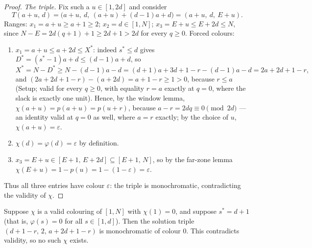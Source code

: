 \begin{proof}
\emph{The triple.} Fix such a $u \in [1, 2d]$ and consider
\[
T(a + u,\, d)
= \bigl(a + u,\ d,\ (a + u) + (d - 1)a + d\bigr)
= (a + u,\ d,\ E + u) .
\]
Ranges: $x_1 = a + u \ge a + 1 \ge 2$; $x_2 = d \in [1, N]$;
$x_3 = E + u \le E + 2d \le N$, since
$N - E = 2d(q+1) + 1 \ge 2d + 1 > 2d$ for every $q \ge 0$.
Forced colours:
\begin{enumerate}
\item[(1)] $x_1 = a + u \le a + 2d \le X^{*}$: indeed $s^{*} \le d$ gives
$D^{*} = (s^{*} - 1)a + d \le (d-1)a + d$, so
\[
X^{*} = N - D^{*} \ge N - (d-1)a - d
= (d+1)a + 3d + 1 - r - (d-1)a - d = 2a + 2d + 1 - r ,
\]
and $(2a + 2d + 1 - r) - (a + 2d) = a + 1 - r \ge 1 > 0$, because
$r \le a$ (Setup; valid for every $q \ge 0$, with equality $r = a$ exactly
at $q = 0$, where the slack is exactly one unit). Hence, by the window
lemma, $\chi(a + u) = p(a + u) = p(u + r)$, because
$a - r = 2dq \equiv 0 \pmod{2d}$ --- an identity valid at $q = 0$ as well,
where $a = r$ exactly; by the choice of $u$, $\chi(a + u) = \varepsilon$.
\item[(2)] $\chi(d) = \varphi(d) = \varepsilon$ by definition.
\item[(3)] $x_3 = E + u \in [E+1,\, E+2d] \subseteq [E+1,\, N]$, so by the
far-zone lemma
$\chi(E + u) = 1 - p(u) = 1 - (1 - \varepsilon) = \varepsilon$.
\end{enumerate}
Thus all three entries have colour $\varepsilon$: the triple is
monochromatic, contradicting the validity of $\chi$.
\end{proof}

\begin{lemma}\label{lem:ub1-caseB}
Suppose $\chi$ is a valid colouring of $[1,N]$ with $\chi(1) = 0$, and
suppose $s^{*} = d + 1$ (that is, $\varphi(s) = 0$ for all $s \in [1,d]$).
Then the solution triple $(d + 1 - r,\, 2,\, a + 2d + 1 - r)$ is
monochromatic of colour $0$. This contradicts validity, so no such $\chi$
exists.
\end{lemma}

